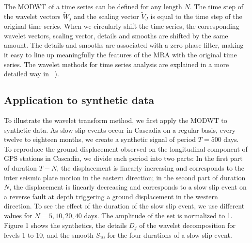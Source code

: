 \documentclass{article}
\begin{document}
The MODWT of a time series can be defined for any length $N$. The time step of the wavelet vectors $\widetilde{W}_j$ and the scaling vector $\widetilde{V}_J$ is equal to the time step of the original time series. When we circularly shift the time series, the corresponding wavelet vectors, scaling vector, details and smooths are shifted by the same amount. The details and smooths are associated with a zero phase filter, making it easy to line up meaningfully the features of the MRA with the original time series. The wavelet methods for time series analysis are explained in a more detailed way in ~\citep{PER_2000}). \\

\subsection{Application to synthetic data}

To illustrate the wavelet transform method, we first apply the MODWT to synthetic data. As slow slip events occur in Cascadia on a regular basis, every twelve to eighteen months, we create a synthetic signal of period $T = 500$ days. To reproduce the ground displacement observed on the longitudinal component of GPS stations in Cascadia, we divide each period into two parts: In the first part of duration $T - N$, the displacement is linearly increasing and corresponds to the inter seismic plate motion in the eastern direction; in the second part of duration $N$, the displacement is linearly decreasing and corresponds to a slow slip event on a reverse fault at depth triggering a ground displacement in the western direction. To see the effect of the duration of the slow slip event, we use different values for $N = 5, 10, 20, 40$ days. The amplitude of the set is normalized to 1. Figure 1 shows the synthetics, the details $D_j$  of the wavelet decomposition for levels 1 to 10, and the smooth $S_{10}$ for the four durations of a slow slip event. \\
\end{document}
